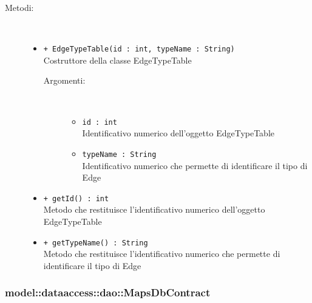 \documentclass[../DefinizioneDiProdotto.tex]{subfiles}
\begin{document}
\begin{description}
\begin{itemize}
\end{itemize}
\item[Metodi:] \
\begin{itemize}
\item \texttt{+ EdgeTypeTable(id : int, typeName : String)}\\
Costruttore della classe EdgeTypeTable
 \begin{description}
\item[Argomenti:] \
\begin{itemize}
\item \texttt{id : int}\\
Identificativo numerico dell'oggetto EdgeTypeTable\item \texttt{typeName : String}\\
Identificativo numerico che permette di identificare il tipo di Edge\end{itemize}
\end{description}
\item \texttt{+ getId() : int}\\
Metodo che restituisce l'identificativo numerico dell'oggetto EdgeTypeTable
 \item \texttt{+ getTypeName() : String}\\
Metodo che restituisce l'identificativo numerico che permette di identificare il tipo di Edge
 \end{itemize}
\end{description}

\subsubsection{model::dataaccess::dao::MapsDbContract}
\end{document}
